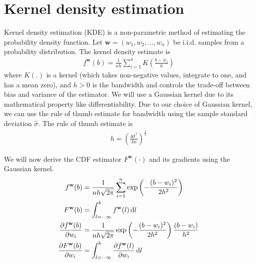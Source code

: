 \section{Kernel density estimation}
Kernel density estimation (KDE) is a non-parametric method of estimating the probability density function. Let $ \mathbf{w} = \left( w_1, w_2, ..., w_n\right)$ be i.i.d. samples from a probability distribution. The kernel density estimate is
\begin{align}
    f^\mathbf{w} (b) = \frac{1}{nh} \sum_{i=1}^{n} K\left(\frac{b-w_i}{h}\right) \label{eqn:kde}
\end{align}
where $K(.)$ is a kernel (which takes non-negative values, integrate to one, and has a mean zero), and $h > 0$ is the bandwidth and controls the trade-off between bias and variance of the estimator. We will use a Gaussian kernel due to its mathematical property like differentiability. Due to our choice of Gaussian kernel, we can use the rule of thumb estimate \cite{silverman1986density} for bandwidth using the sample standard deviation $\hat{\sigma}$. The rule of thumb estimate is
\begin{align}
    h = \left( \frac{4 \hat{\sigma}^5}{3n}\right)^{\frac{1}{5}} \label{eqn:kdebw}
\end{align}

We will now derive the CDF estimator $F^\mathbf{w} \left( \cdot \right)$ and its gradients using the Gaussian kernel.
\begin{align}
    f^\mathbf{w} (b) &= \frac{1}{nh \sqrt{2 \pi}} \sum_{i=1}^{n} \exp \left( -\frac{(b-w_i)^2} {2 h^2}\right) \\
    F^\mathbf{w} (b) &= \int_{l=-\infty}^{b} f^\mathbf{w} (l) \mathop{}\!\mathrm{d} l \label{eqn:kdecdf} \\
    \frac{\partial f^\mathbf{w} (b)}{\partial w_i} &=  \frac{1}{nh \sqrt{2 \pi}} \exp \left( -\frac{(b-w_i)^2} {2 h^2}\right) \frac{ \left( b - w_i \right) }{h^2} \\
    \frac{\partial F^\mathbf{w} (b)} {\partial w_i} &= \int
    _{l=-\infty}^{b} \frac{\partial f^\mathbf{w} (l)}{\partial w_i} \mathop{}\!\mathrm{d} l
\end{align}

